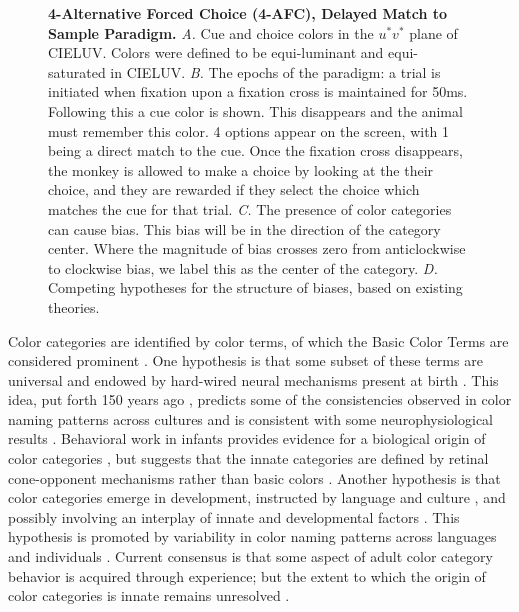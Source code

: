 \begin{figure}
    
    \caption{\textbf{4-Alternative Forced Choice (4-AFC), Delayed Match to Sample Paradigm.}
    \emph{A.} Cue and choice colors in the $u^*v^*$ plane of CIELUV. Colors were defined to be equi-luminant and equi-saturated in CIELUV.
    \emph{B.} The epochs of the paradigm: a trial is initiated when fixation upon a fixation cross is maintained for 50ms. Following this a cue color is shown. This disappears and the animal must remember this color. 4 options appear on the screen, with 1 being a direct match to the cue. Once the fixation cross disappears, the monkey is allowed to make a choice by looking at the their choice, and they are rewarded if they select the choice which matches the cue for that trial.
    \emph{C.} The presence of color categories can cause bias. This bias will be in the direction of the category center.
    Where the magnitude of bias crosses zero from anticlockwise to clockwise bias, we label this as the center of the category.
    \emph{D.} Competing hypotheses for the structure of biases, based on existing theories.
} 
    \label{fig:ParadigmAnalysisPredictions}
    
\end{figure}

Color categories are identified by color terms, of which the Basic Color Terms are considered prominent \citep{berlin_basic_1969}.
One hypothesis is that some subset of these terms are universal \citep{heider_universals_1972,regier_focal_2005}
and endowed by hard-wired neural mechanisms present at birth \citep{bornstein_categories_1976,lindsey_universality_2006}. 
This idea, put forth 150 years ago \citep{hering_zur_1875}, predicts some of the consistencies observed in color naming patterns across cultures \citep{jameson_evolutionary_2009,baronchelli_modeling_2010,lindsey_hunter-gatherer_2015,abbott_focal_2016}
and is consistent with some neurophysiological results \citep{clifford_electrophysiological_2009,holmes_neurophysiological_2009,brouwer_categorical_2013,bird_categorical_2014,yang_cortical_2016,forder_colour_2017}
. 
Behavioral work in infants provides evidence for a biological origin of color categories \citep{franklin_new_2004,ozturk_language_2013}, but suggests that the innate categories are defined by retinal cone-opponent mechanisms rather than basic colors \citep{skelton_biological_2017,maule_color_2019}.
Another hypothesis is that color categories emerge in development, instructed by language and culture \citep{roberson_color_2005, regier_language_2009, cibelli_sapir-whorf_2016}, and possibly involving an interplay of innate and developmental factors \citep{kay_language_2006,franklin_lateralization_2008,regier_language_2009}. 
This hypothesis is promoted by variability in color naming patterns across languages and individuals \citep{davidoff_colour_1999,roberson_color_2000,paramei_online_2018,webster_variations_2002}.
Current consensus is that some aspect of adult color category behavior is acquired through experience; but the extent to which the origin of color categories is innate remains unresolved \citep{davidoff_nature_2009,skelton_colour_2023}.

